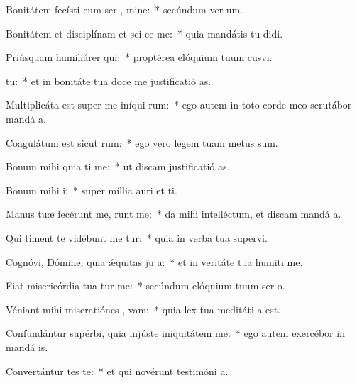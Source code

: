 \item Bonitátem fecísti cum ser , mine:~* secúndum ver um.
\item Bonitátem et disciplínam et sci ce me:~* quia mandátis tu didi.
\item Priúsquam humiliárer  qui:~* proptérea elóquium tuum cusvi.
\item {}  tu:~* et in bonitáte tua doce me justificatió as.
\item Multiplicáta est super me iníqui rum:~* ego autem in toto corde meo scrutábor mandá a.
\item Coagulátum est sicut   rum:~* ego vero legem tuam metus sum.
\item Bonum mihi quia ti me:~* ut discam justificatió as.
\item Bonum mihi   i:~* super míllia auri et ti.
\item Manus tuæ fecérunt me,  runt me:~* da mihi intelléctum, et discam mandá a.
\item Qui timent te vidébunt me  tur:~* quia in verba tua supervi.
\item Cognóvi, Dómine, quia ǽquitas ju a:~* et in veritáte tua humiti me.
\item Fiat misericórdia tua  tur me:~* secúndum elóquium tuum ser o.
\item Véniant mihi miseratiónes ,  vam:~* quia lex tua meditáti a est.
\item Confundántur supérbi, quia injúste iniquitátem   me:~* ego autem exercébor in mandá is.
\item Convertántur  tes te:~* et qui novérunt testimóni a.
